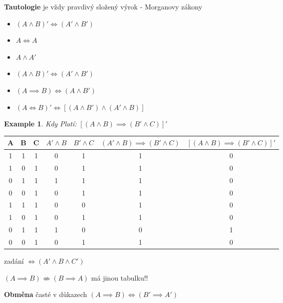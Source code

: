 \documentclass{article}
\theoremstyle{definition}
\newtheorem{exmp}{Example}[section]
\begin{document}
\textbf{Tautologie} je vždy pravdivý složený výrok - Morganovy zákony
\begin{itemize}
\item $ (A \land B)' \Leftrightarrow (A' \wedge B') $
    \item $ A \Leftrightarrow A $
        \item $ A \wedge A' $
    \item $ (A \wedge B)' \Leftrightarrow (A' \land B')$
    \item $ (A \implies B) \Leftrightarrow (A \land B') $
    \item $ (A \Leftrightarrow B)' \Leftrightarrow [ (A \land B') \wedge (A' \land B) ] $
\end{itemize}

\begin{exmp}

    \textit{Kdy Platí: } $ [(A \land B) \implies (B' \wedge C)]'$

    \begin{table}
    \centering
      \begin{tabular}{ c c c | c | c | c | c }
    
          A & B & C & $ A' \land B $ & $ B' \wedge C $ & $ (A' \land B) \implies (B' \wedge C) $ & $ [(A \land B) \implies (B' \wedge C)]' $ \\
          \hline
          1 & 1 & 1 & 0 & 1 & 1 & 0 \\
          1 & 0 & 1 & 0 & 1 & 1 & 0 \\
          0 & 1 & 1 & 1 & 1 & 1 & 0 \\
          0 & 0 & 1 & 0 & 1 & 1 & 0 \\
          1 & 1 & 1 & 0 & 0 & 1 & 0 \\
          1 & 0 & 1 & 0 & 1 & 1 & 0 \\
          0 & 1 & 1 & 1 & 0 & 0 & 1 \\
          0 & 0 & 1 & 0 & 1 & 1 & 0 \\


      
      \end{tabular}
    \end{table}

zadání $ \Leftrightarrow (A' \land B \land C') $

\end{exmp}

$ (A \implies B) \not \Leftrightarrow (B \implies A) $ má jinou tabulku!!

\textbf{Obměna} časté v důkazech
$ (A \implies B) \Leftrightarrow (B' \implies A') $
\end{document}
